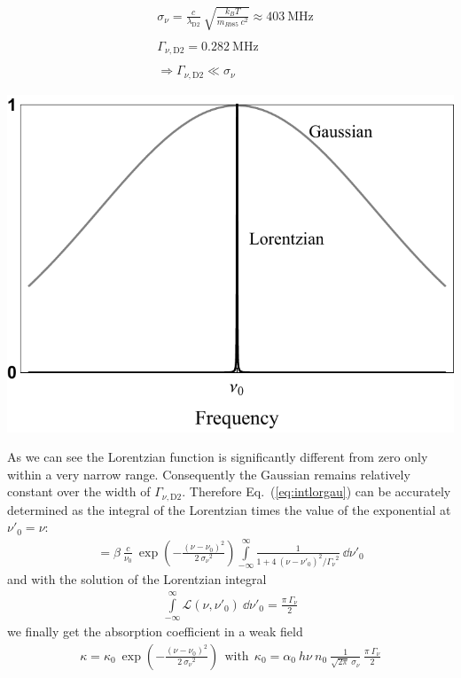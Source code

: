 \begin{minipage}[c][][c]{.45\textwidth}
\centering
\begin{align*}
    &\sigma_\nu = \frac{c}{\lambda_\mathrm{D2}}~\sqrt{\frac{k_B T}{m_{Rb85}~c^2}} 
    \approx \SI{403}{\mega\hertz} \\ \\
    &\Gamma_{\nu,\mathrm{D2}} = \SI{0.282}{\mega\hertz} \\ \\
    &\Rightarrow \Gamma_{\nu,\mathrm{D2}} \ll \sigma_\nu
\end{align*}
\end{minipage}
\hfill
\begin{minipage}[c]{.45\textwidth}
\includegraphics[width=\textwidth]{gauvslor}
\end{minipage}
\bigskip

As we can see the Lorentzian function is significantly different from zero only 
within a very narrow range. Consequently the Gaussian remains relatively constant 
over the width of \(\Gamma_{\nu,\mathrm{D2}} \). Therefore Eq.~(\ref{eq:intlorgau}) 
can be accurately determined as the integral of the Lorentzian times the 
value of the exponential at \(\nu'_0 = \nu \):
\begin{align}
    = \beta~\frac{c}{\nu_0}~
    \exp{ \left ( -\frac{{(\nu - \nu_0)}^2 }{2~{\sigma_\nu}^2 } \right )} 
    \int\limits_{-\infty}^{\infty} \frac{1}{ 1+4~{(\nu-\nu'_0)}^2 / {\Gamma_\nu}^2 }~
    \dd \nu'_0
\end{align}
and with the solution of the Lorentzian integral
\begin{align}
    \int\limits_{-\infty}^{\infty} \mathcal{L}(\nu,\nu'_0)~\dd \nu'_0 = 
    \frac{\pi~\Gamma_\nu}{2}
\end{align}
we finally get the absorption coefficient in a weak field
\begin{align}\label{eq:kappa_weakfield}
    \kappa = \kappa_0~\exp{ \left ( -\frac{{(\nu - \nu_0)}^2 }{2~{\sigma_\nu}^2 } \right )}
     ~~\text{with}~~ \kappa_0 = \alpha_0 ~ h\nu ~ n_0 ~ \frac{1}{\sqrt{2\pi}~\sigma_\nu}~
     \frac{\pi~\Gamma_\nu}{2}
\end{align}


